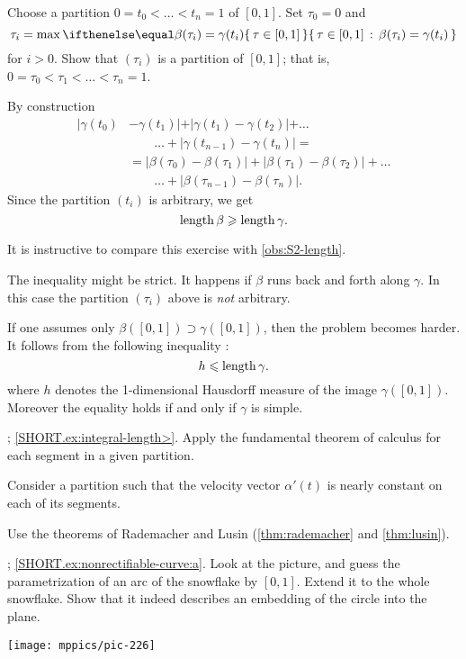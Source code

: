 \begin{multicols}{2}
Choose a partition $0=t_0<\dots <t_n=1$ of $[0,1]$.
Set $\tau_0=0$ and 
\[\tau_i=\max\set{\tau \in[0,1]}{\beta(\tau_i)=\gamma(t_i)}\]
for $i>0$.
Show that $(\tau_i)$ is a partition of $[0,1]$;
that is, $0=\tau_0<\tau_1<\dots<\tau_n=1$.

By construction 
\begin{align*}
|\gamma(t_0)&-\gamma(t_1)|+|\gamma(t_1)-\gamma(t_2)|+\dots
\\
&\qquad\dots+|\gamma(t_{n-1})-\gamma(t_n)|=
\\
&=
|\beta(\tau_0)-\beta(\tau_1)|+|\beta(\tau_1)-\beta(\tau_2)|+\dots
\\
&\qquad\dots+|\beta(\tau_{n-1})-\beta(\tau_n)|.
\end{align*}
Since the partition $(t_i)$ is arbitrary, we get 
\[\mathop{\rm length}\nolimits \beta\geqslant \mathop{\rm length}\nolimits \gamma.\]

It is instructive to compare this exercise with \ref{obs:S2-length}.

The inequality might be strict.
It happens if $\beta$ runs back and forth along $\gamma$.
In this case the partition $(\tau_i)$ above is \textit{not} arbitrary.

If one assumes only $\beta([0,1])\supset\gamma([0,1])$, then the problem becomes harder.
It follows from the following inequality \cite[2.6.1+2.6.2]{burago-burago-ivanov}:
\[h\leqslant \mathop{\rm length}\nolimits\gamma.\]
where $h$ denotes the 1-dimensional Hausdorff measure of the image $\gamma([0,1])$.
Moreover the equality holds if and only if $\gamma$ is simple.

\parbf{\ref{ex:integral-length}}; \ref{SHORT.ex:integral-length>}.
Apply the fundamental theorem of calculus for each segment in a given partition.

 Consider a partition such that the velocity vector $\alpha'(t)$ is nearly constant on each of its segments.

Use the theorems of Rademacher and Lusin (\ref{thm:rademacher} and \ref{thm:lusin}).

\parbf{\ref{ex:nonrectifiable-curve}}; \ref{SHORT.ex:nonrectifiable-curve:a}.
Look at the picture, and guess the parametrization of an arc of the snowflake by $[0,1]$.
Extend it to the whole snowflake.
Show that it indeed describes an embedding of the circle into the plane.

\begin{Figure}
\vskip-0mm
\centering
\texttt{[image: mppics/pic-226]}
\vskip0mm
\end{Figure}


\end{multicols}

